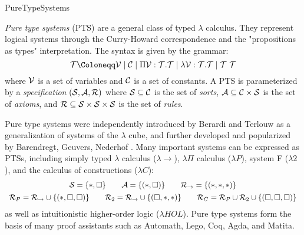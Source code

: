 \begin{entry}{PureTypeSystems}
\begin{clarifications}
\emph{Pure type systems} (PTS) are a general class of typed $\lambda$ calculus. They represent logical systems through the Curry-Howard correspondence and the "propositions as types" interpretation. The syntax is given by the grammar:
\negvspace\[
  \terms \Coloneqq \variables \mid \constants \mid \Pi \variables : \terms. \terms \mid \lambda \variables : \terms. \terms \mid \terms~\terms
\negvspace\]
where $\mathcal{V}$ is a set of variables and $\mathcal{C}$ is a set of constants.
A PTS is parameterized by a \emph{specification} $(\mathcal{S}, \mathcal{A}, \mathcal{R})$ where
$\mathcal{S} \subseteq \mathcal{C}$ is the set of \emph{sorts},
$\mathcal{A} \subseteq \mathcal{C} \times \mathcal{S}$ is the set of \emph{axioms}, and
$\mathcal{R} \subseteq \mathcal{S} \times \mathcal{S} \times \mathcal{S}$ is the set of \emph{rules}.
\end{clarifications}

\begin{history}
Pure type systems were independently introduced by Berardi and Terlouw as a generalization of systems of the $\lambda$ cube, and further developed and popularized by Barendregt, Geuvers, Nederhof \cite{barendregt_introduction_1991,geuvers_modular_1991,barendregt_lambda_1992,geuvers_logics_1993}. Many important systems can be expressed as PTSs, including simply typed $\lambda$ calculus ($\lambda{\rightarrow}$), $\lambda\Pi$ calculus  ($\lambda{P}$), system F  ($\lambda{2}$), and the calculus of constructions ($\lambda{C}$):
\negvspace\[
  \begin{array}{cc}
    \sorts = \{\Prop, \Type\} \qquad \axioms = \{(\Prop, \Type)\} \qquad \rules_{\rightarrow} = \{(\Prop, \Prop, \Prop)\} \\[1ex]
    \rules_{P} = \rules_{\rightarrow} \union \{(\Prop,\Type,\Type)\} \qquad
    \rules_{2} = \rules_{\rightarrow} \union \{(\Type,\Prop,\Prop)\} \qquad
    \rules_{C} = \rules_{P} \union \rules_{2} \union \{(\Type,\Type,\Type)\}
  \end{array}
\negvspace\]
as well as intuitionistic higher-order logic ($\lambda{HOL}$). Pure type systems form the basis of many proof assistants such as Automath, Lego, Coq, Agda, and Matita.
\end{history}


\end{entry}
